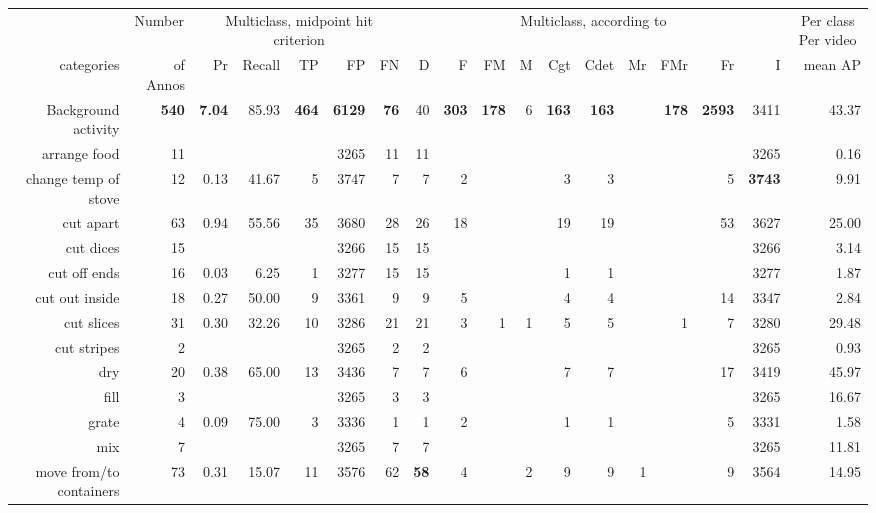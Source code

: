\begin{tabular}{r r r@{\ \ }r@{\ \ }r@{\ \ }r@{\ \ }r r@{\ \ }r@{\ \ }r@{\ \ }r@{\ \ }r@{\ \ }r@{\ \ }r@{\ \ }r@{\ \ }r@{\ \ }r r}
\toprule  & \multicolumn{1}{c}{Number}  & \multicolumn{5}{c}{Multiclass, midpoint hit criterion}  & \multicolumn{10}{c}{Multiclass, according to~\cite{ward11tist}}  & \multicolumn{1}{c}{Per class Per video} \\
categories&of Annos&Pr&Recall&TP&FP&FN&D&F&FM&M&Cgt&Cdet&Mr&FMr&Fr&I&mean AP\\
\cmidrule(lr){1-1} \cmidrule(lr){2-2} \cmidrule(lr){3-7} \cmidrule(lr){8-17} \cmidrule(lr){18-18}
 Background activity & \textbf{540} & \textbf{7.04} & 85.93 & \textbf{464} & \textbf{6129} & \textbf{76} & 40 & \textbf{303} & \textbf{178} & 6 & \textbf{163} & \textbf{163} &  & \textbf{178} & \textbf{2593} & 3411 & 43.37 \\
arrange food & 11 &  &  &  & 3265 & 11 & 11 &  &  &  &  &  &  &  &  & 3265 & 0.16 \\
change temp of stove & 12 & 0.13 & 41.67 & 5 & 3747 & 7 & 7 & 2 &  &  & 3 & 3 &  &  & 5 & \textbf{3743} & 9.91 \\
cut apart & 63 & 0.94 & 55.56 & 35 & 3680 & 28 & 26 & 18 &  &  & 19 & 19 &  &  & 53 & 3627 & 25.00 \\
cut dices & 15 &  &  &  & 3266 & 15 & 15 &  &  &  &  &  &  &  &  & 3266 & 3.14 \\
cut off ends & 16 & 0.03 & 6.25 & 1 & 3277 & 15 & 15 &  &  &  & 1 & 1 &  &  &  & 3277 & 1.87 \\
cut out inside & 18 & 0.27 & 50.00 & 9 & 3361 & 9 & 9 & 5 &  &  & 4 & 4 &  &  & 14 & 3347 & 2.84 \\
cut slices & 31 & 0.30 & 32.26 & 10 & 3286 & 21 & 21 & 3 & 1 & 1 & 5 & 5 &  & 1 & 7 & 3280 & 29.48 \\
cut stripes & 2 &  &  &  & 3265 & 2 & 2 &  &  &  &  &  &  &  &  & 3265 & 0.93 \\
dry & 20 & 0.38 & 65.00 & 13 & 3436 & 7 & 7 & 6 &  &  & 7 & 7 &  &  & 17 & 3419 & 45.97 \\
fill & 3 &  &  &  & 3265 & 3 & 3 &  &  &  &  &  &  &  &  & 3265 & 16.67 \\
grate & 4 & 0.09 & 75.00 & 3 & 3336 & 1 & 1 & 2 &  &  & 1 & 1 &  &  & 5 & 3331 & 1.58 \\
mix & 7 &  &  &  & 3265 & 7 & 7 &  &  &  &  &  &  &  &  & 3265 & 11.81 \\
move from/to containers & 73 & 0.31 & 15.07 & 11 & 3576 & 62 & \textbf{58} & 4 &  & 2 & 9 & 9 & 1 &  & 9 & 3564 & 14.95 \\

\end{tabular}
